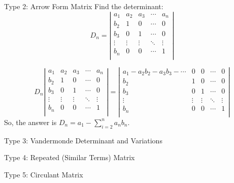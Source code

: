 \documentclass{beamer}
\begin{document}
\begin{frame}{Type 2: Arrow Form Matrix}
Find the determinant:
\begin{equation*}
D_n=\left| \begin{matrix}
	a_1&		a_2&		a_3&		\cdots&		a_n\\
	b_2&		1&		0&		\cdots&		0\\
	b_3&		0&		1&		\cdots&		0\\
	\vdots&		\vdots&		\vdots&		\ddots&		\vdots\\
	b_n&		0&		0&		\cdots&		1\\
\end{matrix} \right|
\end{equation*}

\begin{equation*}
    D_n\left| \begin{matrix}
        a_1&		a_2&		a_3&		\cdots&		a_n\\
        b_2&		1&		0&		\cdots&		0\\
        b_3&		0&		1&		\cdots&		0\\
        \vdots&		\vdots&		\vdots&		\ddots&		\vdots\\
        b_n&		0&		0&		\cdots&		1\\
    \end{matrix} \right|=\left| \begin{matrix}
        a_1-a_2b_2-a_3b_3-\cdots&		0&		0&		\cdots&		0\\
        b_2&		1&		0&		\cdots&		0\\
        b_3&		0&		1&		\cdots&		0\\
        \vdots&		\vdots&		\vdots&		\ddots&		\vdots\\
        b_n&		0&		0&		\cdots&		1\\
    \end{matrix} \right|
\end{equation*}
So, the answer is $D_n=a_1-\sum_{i=2}^n{a_nb_n}$.
\end{frame}

\begin{frame}{Type 3: Vandermonde Determinant and Variations}
    
\end{frame}

\begin{frame}{Type 4: Repeated (Similar Terms) Matrix}
    
\end{frame}

\begin{frame}{Type 5: Circulant Matrix}
    
\end{frame}
\end{document}
